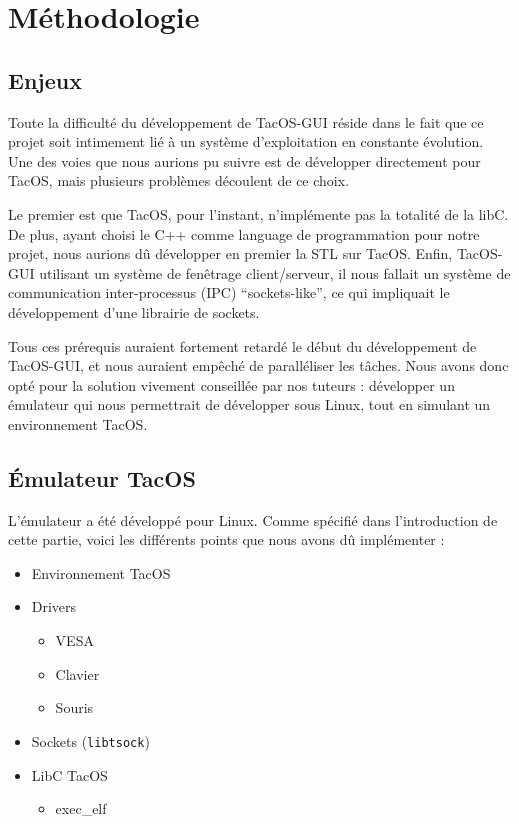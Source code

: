 \section{Méthodologie}

\subsection{Enjeux}

Toute la difficulté du développement de TacOS-GUI réside dans le fait que ce projet soit intimement lié à un système d'exploitation en constante évolution.
Une des voies que nous aurions pu suivre est de développer directement pour TacOS, mais plusieurs problèmes découlent de ce choix.

Le premier est que TacOS, pour l'instant, n'implémente pas la totalité de la libC.
De plus, ayant choisi le C++ comme language de programmation pour notre projet, nous aurions dû développer en premier la STL sur TacOS.
Enfin, TacOS-GUI utilisant un système de fenêtrage client/serveur, il nous fallait un système de communication inter-processus (IPC) ``sockets-like'', ce qui impliquait le développement d'une librairie de sockets.

Tous ces prérequis auraient fortement retardé le début du développement de TacOS-GUI, et nous auraient empêché de paralléliser les tâches.
Nous avons donc opté pour la solution vivement conseillée par nos tuteurs : développer un émulateur qui nous permettrait de développer sous Linux, tout en simulant un environnement TacOS.

\subsection{Émulateur TacOS}

L'émulateur a été développé pour Linux. Comme spécifié dans l'introduction de cette partie, voici les différents points que nous avons dû implémenter :

\begin{itemize}
  \item Environnement TacOS
  \item Drivers
  \begin{itemize}
    \item VESA
    \item Clavier
    \item Souris 
  \end{itemize}
  \item Sockets (\verb|libtsock|)
  \item LibC TacOS
  \begin{itemize}
    \item exec\_elf
  \end{itemize}
\end{itemize}

